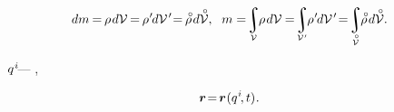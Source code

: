 \nopagebreak\vspace{-0.2em}
\begin{equation}\label{thebalanceofmass}
dm \hspace{-0.15ex}
= \hspace{-0.2ex} \rho \hspace{.2ex} d\mathcal{V} \hspace{-0.2ex}
= \hspace{-0.2ex} \rho\hspace{.1ex}' \hspace{-0.2ex} d\mathcal{V}\hspace{.2ex}' \hspace{-0.5ex}
= \hspace{-0.2ex} \mathcircabove{\rho} \hspace{.22ex} d\mathcircabove{\mathcal{V}} ,
\hspace{.6em}
%
m = \hspace{-0.4ex} \scalebox{0.9}{$\displaystyle\integral\displaylimits_{\mathcal{V}}$} \hspace{-0.2ex} \rho \hspace{.2ex} d\mathcal{V} \hspace{-0.1ex}
= \hspace{-0.4ex} \scalebox{0.9}{$\displaystyle\integral\displaylimits_{\mathcal{V}\hspace{.12ex}'}$} \hspace{-0.2ex} \rho\hspace{.1ex}' \hspace{-0.2ex} d\mathcal{V}\hspace{.2ex}' \hspace{-0.4ex}
= \hspace{-0.4ex} \scalebox{0.9}{$\displaystyle\integral\displaylimits_{\mathcircabove{\mathcal{V}}}$} \hspace{-0.2ex} \mathcircabove{\rho} \hspace{.22ex} d\mathcircabove{\mathcal{V}} .
\vspace{-0.5em}\end{equation}

  ~${q^{\hspace{.1ex}i}\hspace{-0.3ex}}$\:--- ,  

\nopagebreak\vspace{-0.2em}\begin{equation}\label{particlelocationbycoordinatesandtime}
\bm{r} \hspace{-0.4ex} = \hspace{-0.3ex} \bm{r} \hspace{.1ex} (q^{\hspace{.1ex}i} \hspace{-0.33ex}, t)
\hspace{.1ex} .
\end{equation}

